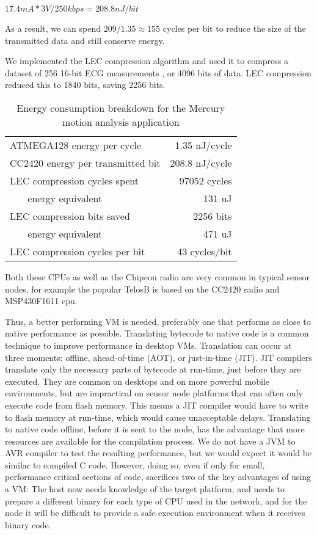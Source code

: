 $17.4mA * 3V / 250kbps = 208.8nJ / bit$

As a result, we can spend $209/1.35 \approx 155$ cycles per bit to reduce the size of the transmitted data and still conserve energy.

We implemented the LEC compression algorithm and used it to compress a dataset of 256 16-bit ECG measurements \cite{physionet-ecg-data}, or 4096 bits of data. LEC compression reduced this to  1840 bits, saving 2256 bits.



\begin{table}[H]
\centering
\caption{Energy consumption breakdown for the Mercury motion analysis application}
\label{tbl-mercury-energy}
\begin{tabular}{lr}
\toprule
\midrule
ATMEGA128 energy per cycle            & 1.35 nJ/cycle  \\
CC2420 energy per transmitted bit     & 208.8 nJ/cycle  \\
\midrule
LEC compression cycles spent          & 97052 cycles\\
~~~ energy equivalent                 & 131 uJ \\
LEC compression bits saved            & 2256 bits \\
~~~ energy equivalent                 & 471 uJ \\
LEC compression cycles per bit        & 43 cycles/bit \\
\end{tabular}
\end{table}

Both these CPUs as well as the Chipcon radio are very common in typical sensor nodes, for example the popular TelosB is based on the CC2420 radio and MSP430F1611 cpu.



Thus, a better performing VM is needed, preferably one that performs as close to native performance as possible. Translating bytecode to native code is a common technique to improve performance in desktop VMs. Translation can occur at three moments: offline, ahead-of-time (AOT), or just-in-time (JIT). JIT compilers translate only the necessary parts of bytecode at run-time, just before they are executed. They are common on desktops and on more powerful mobile environments, but are impractical on sensor node platforms that can often only execute code from flash memory. This means a JIT compiler would have to write to flash memory at run-time, which would cause unacceptable delays. Translating to native code offline, before it is sent to the node, has the advantage that more resources are available for the compilation process. We do not have a JVM to AVR compiler to test the resulting performance, but we would expect it would be similar to compiled C code. However, doing so, even if only for small, performance critical sections of code, sacrifices two of the key advantages of using a VM: The host now needs knowledge of the target platform, and needs to prepare a different binary for each type of CPU used in the network, and for the node it will be difficult to provide a safe execution environment when it receives binary code.

